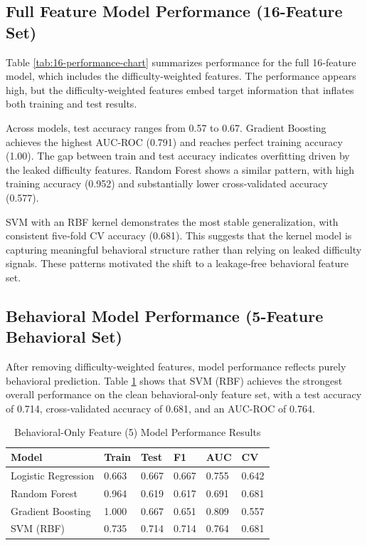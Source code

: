 \documentclass[conference]{IEEEtran}
\begin{document}
\subsection{ Full Feature Model Performance (16-Feature Set)}
Table \ref{tab:16-performance-chart} summarizes performance for the full 16‑feature model, which includes the difficulty‑weighted features. The performance appears high, but the difficulty‑weighted features embed target information that inflates both training and test results.


Across models, test accuracy ranges from 0.57 to 0.67. Gradient Boosting achieves the highest AUC‑ROC (0.791) and reaches perfect training accuracy (1.00). The gap between train and test accuracy indicates overfitting driven by the leaked difficulty features. Random Forest shows a similar pattern, with high training accuracy (0.952) and substantially lower cross‑validated accuracy (0.577).


SVM with an RBF kernel demonstrates the most stable generalization, with consistent five‑fold CV accuracy (0.681). This suggests that the kernel model is capturing meaningful behavioral structure rather than relying on leaked difficulty signals. These patterns motivated the shift to a leakage‑free behavioral feature set.

\subsection{Behavioral Model Performance (5-Feature Behavioral Set)}

After removing difficulty-weighted features, model performance reflects
purely behavioral prediction. Table \ref{tab:5-performance-chart} shows that
SVM (RBF) achieves the strongest overall performance on the clean
behavioral-only feature set, with a test accuracy of 0.714, cross-validated accuracy of 0.681, and an AUC-ROC of 0.764.


\begin{table}[H]
\centering
\caption{Behavioral-Only Feature (5) Model Performance Results}
\begin{tabular}{|p{2.2cm}|p{.8cm}|p{.8cm}|p{.8cm}|p{.8cm}|p{.8cm}|}
\hline
\textbf{Model} & \textbf{Train} & \textbf{Test} & \textbf{F1} & \textbf{AUC} & \textbf{CV}\\
\hline
Logistic Regression  & 0.663 & 0.667  & 0.667  & 0.755 & 0.642 \\
\hline
Random Forest & 0.964 & 0.619  & 0.617 & 0.691 &  0.681 \\
\hline
Gradient Boosting & 1.000 & 0.667  & 0.651 & 0.809 &  0.557 \\
\hline
SVM (RBF) & 0.735 & 0.714  & 0.714 & 0.764 &  0.681 \\
\hline
\end{tabular}
\label{tab:5-performance-chart}
\end{table}
\end{document}
